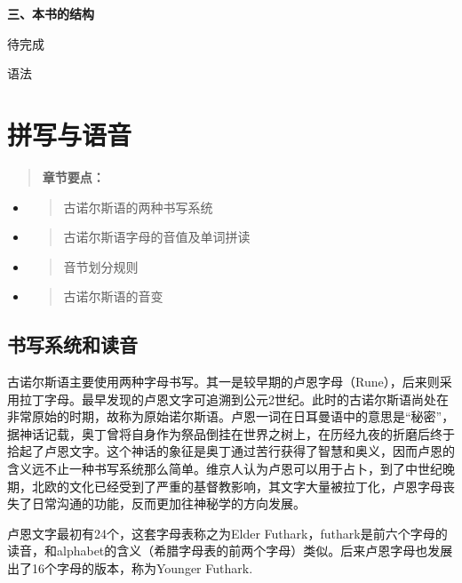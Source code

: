 \textbf{三、本书的结构}

待完成

语法

\section{拼写与语音}\label{ux62fcux5199ux4e0eux8bedux97f3}

\begin{quote}
  \textbf{章节要点：}
\end{quote}

\begin{itemize}
  \item
        \begin{quote}
          古诺尔斯语的两种书写系统
        \end{quote}
  \item
        \begin{quote}
          古诺尔斯语字母的音值及单词拼读
        \end{quote}
  \item
        \begin{quote}
          音节划分规则
        \end{quote}
  \item
        \begin{quote}
          古诺尔斯语的音变
        \end{quote}
\end{itemize}

\subsection{书写系统和读音}\label{ux4e66ux5199ux7cfbux7edfux548cux8bfbux97f3}

古诺尔斯语主要使用两种字母书写。其一是较早期的卢恩字母（Rune），后来则采用拉丁字母。最早发现的卢恩文字可追溯到公元2世纪。此时的古诺尔斯语尚处在非常原始的时期，故称为原始诺尔斯语。卢恩一词在日耳曼语中的意思是``秘密''，据神话记载，奥丁曾将自身作为祭品倒挂在世界之树上，在历经九夜的折磨后终于拾起了卢恩文字。这个神话的象征是奥丁通过苦行获得了智慧和奥义，因而卢恩的含义远不止一种书写系统那么简单。维京人认为卢恩可以用于占卜，到了中世纪晚期，北欧的文化已经受到了严重的基督教影响，其文字大量被拉丁化，卢恩字母丧失了日常沟通的功能，反而更加往神秘学的方向发展。

卢恩文字最初有24个，这套字母表称之为Elder
Futhark，futhark是前六个字母的读音，和alphabet的含义（希腊字母表的前两个字母）类似。后来卢恩字母也发展出了16个字母的版本，称为Younger
Futhark.

